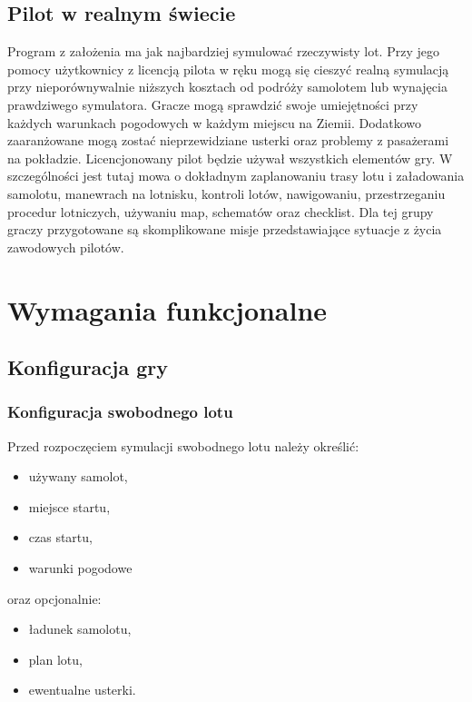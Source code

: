\documentclass{mwrep}
\begin{document}
\section{Pilot w realnym świecie}

Program z założenia ma jak najbardziej symulować rzeczywisty lot. Przy jego pomocy użytkownicy z licencją pilota w ręku mogą się cieszyć realną symulacją przy nieporównywalnie niższych kosztach od podróży samolotem lub wynajęcia prawdziwego symulatora. Gracze mogą sprawdzić swoje umiejętności przy każdych warunkach pogodowych w każdym miejscu na Ziemii. Dodatkowo zaaranżowane mogą zostać nieprzewidziane usterki oraz problemy z pasażerami na pokładzie. Licencjonowany pilot będzie używał wszystkich elementów gry. W szczególności jest tutaj mowa o dokładnym zaplanowaniu trasy lotu i załadowania samolotu, manewrach na lotnisku, kontroli lotów, nawigowaniu, przestrzeganiu procedur lotniczych, używaniu map, schematów oraz checklist. Dla tej grupy graczy przygotowane są skomplikowane misje przedstawiające sytuacje z życia zawodowych pilotów.

\chapter{Wymagania funkcjonalne}

\section{Konfiguracja gry}

\subsection{Konfiguracja swobodnego lotu}

Przed rozpoczęciem symulacji swobodnego lotu należy określić:
\begin{itemize}
\item używany samolot,
\item miejsce startu,
\item czas startu,
\item warunki pogodowe
\end{itemize}
oraz opcjonalnie:
\begin{itemize}
\item ładunek samolotu,
\item plan lotu,
\item ewentualne usterki.
\end{itemize}
\end{document}
